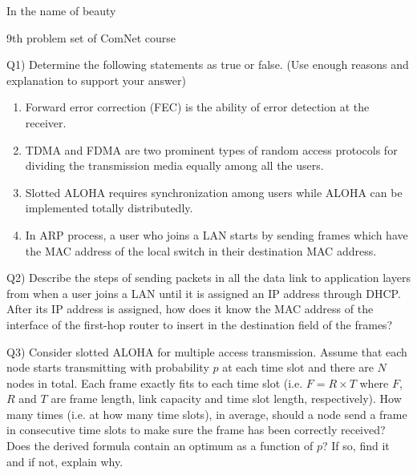 \documentclass[10pt,letterpaper]{article}
\begin{document}
\Large
\begin{center}
In the name of beauty

9th problem set of ComNet course

\hrulefill
\end{center}
Q1) Determine the following statements as true or false. (Use enough reasons and explanation to support your answer)

\begin{enumerate}[label=\alph*-]
\item
Forward error correction (FEC) is the ability of error detection at the receiver.
\item
TDMA and FDMA are two prominent types of random access protocols for dividing the transmission media equally among all the users.
\item
Slotted ALOHA requires synchronization among users while ALOHA can be implemented totally distributedly.
\item
In ARP process, a user who joins a LAN starts by sending frames which have the MAC address of the local switch in their destination MAC address.
\end{enumerate}

Q2) Describe the steps of sending packets in all the data link to application layers  from when a user joins a LAN until it is assigned an IP address through DHCP. After its IP address is assigned, how does it know the MAC address of the interface of the first-hop router to insert in the destination field of the frames?

Q3) 
Consider slotted ALOHA for multiple access transmission. Assume that each node starts transmitting with probability $p$ at each time slot and there are $N$ nodes in total. Each frame exactly fits to each time slot (i.e. $F=R\times T$ where $F$, $R$ and $T$ are frame length, link capacity and time slot length, respectively). How many times (i.e. at how many time slots), in average, should a node send a frame in consecutive time slots to make sure the frame has been correctly received? Does the derived formula contain an optimum as a function of $p$? If so, find it and if not, explain why.
\end{document}
